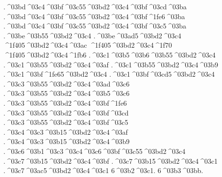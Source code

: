{.^^^^03bd^^^^03c4^^^^03bf^^^^03c55^^^^03bd2^^^^03c4^^^^03bf^^^^03cd^^^^03ba %
.^^^^03bd^^^^03c4^^^^03bf^^^^03c55^^^^03bd2^^^^03c4^^^^03bf^^^^1fe6^^^^03ba
.^^^^03bd^^^^03c4^^^^03bf^^^^03c55^^^^03bd2^^^^03c4^^^^03bf^^^^03c5^^^^03ba
.^^^^03be^^^^03b55^^^^03bd2^^^^03c4      %
.^^^^03be^^^^03ad5^^^^03bd2^^^^03c4
^^^^1f405^^^^03bd2^^^^03c4^^^^03ac     %
^^^^1f405^^^^03bd2^^^^03c4^^^^1f70
^^^^1f405^^^^03bd2^^^^03c4^^^^1fb6
.^^^^03c1^^^^03b5^^^^03b6^^^^03b55^^^^03bd2^^^^03c4    %
.^^^^03c1^^^^03b55^^^^03bd2^^^^03c4^^^^03af    %
.^^^^03c1^^^^03b55^^^^03bd2^^^^03c4^^^^03b9 
.^^^^03c1^^^^03bf^^^^1fe65^^^^03bd2^^^^03c4    %
.^^^^03c1^^^^03bf^^^^03cd5^^^^03bd2^^^^03c4
.^^^^03c3^^^^03b55^^^^03bd2^^^^03c4^^^^03ad^^^^03c6   %
.^^^^03c3^^^^03b55^^^^03bd2^^^^03c4^^^^03b5^^^^03c6
.^^^^03c3^^^^03b55^^^^03bd2^^^^03c4^^^^03bf^^^^1fe6   %
.^^^^03c3^^^^03b55^^^^03bd2^^^^03c4^^^^03bf^^^^03cd
.^^^^03c3^^^^03b55^^^^03bd2^^^^03c4^^^^03bf^^^^03c5
.^^^^03c4^^^^03c3^^^^03b15^^^^03bd2^^^^03c4^^^^03af   %
.^^^^03c4^^^^03c3^^^^03b15^^^^03bd2^^^^03c4^^^^03b9
.^^^^03c6^^^^03b1^^^^03c3^^^^03c4^^^^03c6^^^^03bf^^^^03c55^^^^03bd2^^^^03c4 %
.^^^^03c7^^^^03b15^^^^03bd2^^^^03c4^^^^03bf     %
.^^^^03c7^^^^03b15^^^^03bd2^^^^03c4^^^^03c1     %
.^^^^03c7^^^^03ac5^^^^03bd2^^^^03c4^^^^03c1
6^^^^03b2^^^^03c1.   %
6^^^^03b3^^^^03bb.   %
}
